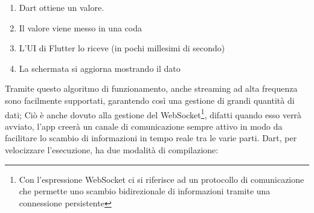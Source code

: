 \documentclass[target=bach,aauheader=,style=]{thud}
\begin{document}
\begin{enumerate}
    \item Dart ottiene un valore.
    \item Il valore viene messo in una coda
    \item L'UI di Flutter lo riceve (in pochi millesimi di secondo)
    \item La schermata si aggiorna mostrando il dato
\end{enumerate}
Tramite questo algoritmo di funzionamento, anche streaming ad alta frequenza sono facilmente supportati, garantendo così una gestione di grandi quantità di dati;
Ciò è anche dovuto alla gestione del WebSocket\footnote{Con l'espressione WebSocket ci si riferisce ad un protocollo di comunicazione che permette uno scambio bidirezionale di informazioni tramite una connessione persistente}, difatti quando esso verrà avviato, l’app creerà un canale di comunicazione sempre attivo in modo da facilitare lo scambio di informazioni in tempo
reale tra le varie parti. 
Dart, per velocizzare l’esecuzione, ha due modalità di compilazione:
\end{document}
